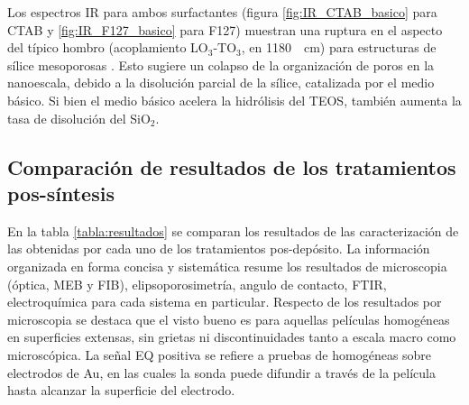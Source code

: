 		 Los espectros IR para ambos surfactantes (figura \ref{fig:IR_CTAB_basico} para CTAB y \ref{fig:IR_F127_basico} para F127) muestran una ruptura en el aspecto del típico hombro (acoplamiento LO$_3$-TO$_3$, en \SI{1180}{\per\cm}) para estructuras de sílice mesoporosas \cite{Olsen1989,Innocenzi2003,Angelome2008}. Esto sugiere un colapso de la organización de poros en la nanoescala, debido a la disolución parcial de la sílice, catalizada por el medio básico. Si bien el medio básico acelera la hidrólisis del TEOS, también aumenta la tasa de disolución del SiO$_2$.\cite{Mazer1994,Niibori2000,Gorrepati2010}

	 \subsection{Comparación de resultados de los tratamientos pos-síntesis}
	 		
	 		En la tabla \ref{tabla:resultados} se comparan los resultados de las caracterización de las \pdm\space obtenidas por cada uno de los tratamientos pos-depósito. La información organizada en forma concisa y sistemática resume los resultados de microscopia (óptica, MEB y FIB), elipsoporosimetría, angulo de contacto, FTIR, electroquímica para cada sistema en particular. Respecto de los resultados por microscopia se destaca que el visto bueno es para aquellas películas homogéneas en superficies extensas, sin grietas ni discontinuidades tanto a escala macro como microscópica. La señal EQ positiva se refiere a pruebas de \pdm\space homogéneas sobre electrodos de Au, en las cuales la sonda puede difundir a través de la película hasta alcanzar la superficie del electrodo.


	 
